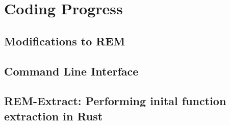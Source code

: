 \section{Coding Progress}

\subsection{Modifications to REM}

\subsection{Command Line Interface}

\subsection{REM-Extract: Performing inital function extraction in Rust}